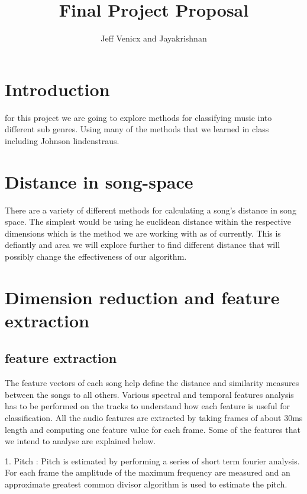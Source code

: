 \documentclass[10pt,a4paper]{article}
\author{Jeff Venicx and Jayakrishnan}
\title{Final Project Proposal}
\begin{document}
	
	\maketitle

	\newpage
	
	\section{Introduction}
	for this project we are going to explore methods for classifying music into different sub genres. Using many of the methods that we learned in class including Johnson lindenstraus.
	\section{Distance in song-space}
	
	There are a variety of different methods for calculating a song's distance in song space. The simplest would be using he euclidean distance within the respective dimensions which is the method we are working with as of currently. This is defiantly and area we will explore further to find different distance that will possibly change the effectiveness of our algorithm. 
	
	\section{Dimension reduction and feature extraction}
	
	\subsection{feature extraction}
	The feature vectors of each song help define the distance and similarity measures between the songs to all others. Various spectral and temporal features analysis has to be performed on the tracks to understand how each feature is useful for classification. All the audio features are extracted by taking frames of about 30ms length and computing one feature value for each frame. Some of the features that we intend to analyse are explained below.\\
	\newline
	
	1.	Pitch : Pitch is estimated by performing a series of short term fourier analysis. For each frame the amplitude of the maximum frequency are measured and an approximate greatest common divisor algorithm is used to estimate the pitch.\\
	
\end{document}
